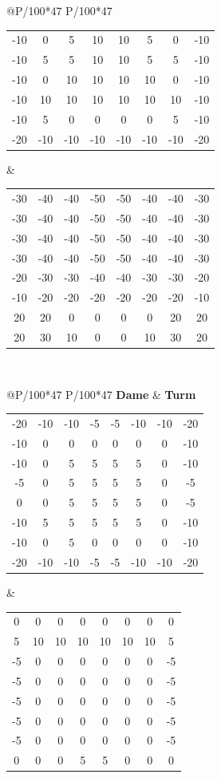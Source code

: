 \begin{table}[htbp]
\begin{tabular}{@{}P{\textwidth/100*47} P{\textwidth/100*47}}
\begin{tabular}{@{}c c c c c c c c}
-10&0&5&10&10&5&0&-10\\
-10&5&5&10&10&5&5&-10\\
-10&0&10&10&10&10&0&-10\\
-10&10&10&10&10&10&10&-10\\
-10&5&0&0&0&0&5&-10\\
-20&-10&-10&-10&-10&-10&-10&-20
\end{tabular}
&
\begin{tabular}{c c c c c c c c}
-30&-40&-40&-50&-50&-40&-40&-30\\
-30&-40&-40&-50&-50&-40&-40&-30\\
-30&-40&-40&-50&-50&-40&-40&-30\\
-30&-40&-40&-50&-50&-40&-40&-30\\
-20&-30&-30&-40&-40&-30&-30&-20\\
-10&-20&-20&-20&-20&-20&-20&-10\\
20&20&0&0&0&0&20&20\\
20&30&10&0&0&10&30&20
\end{tabular}
\end{tabular}\\
\begin{tabular}{@{}P{\textwidth/100*47} P{\textwidth/100*47}}
\textbf{Dame} & \textbf{Turm}\\
\begin{tabular}{@{}c c c c c c c c}
-20&-10&-10&-5&-5&-10&-10&-20\\
-10&0&0&0&0&0&0&-10\\
-10&0&5&5&5&5&0&-10\\
-5&0&5&5&5&5&0&-5\\
0&0&5&5&5&5&0&-5\\
-10&5&5&5&5&5&0&-10\\
-10&0&5&0&0&0&0&-10\\
-20&-10&-10&-5&-5&-10&-10&-20
\end{tabular}
&
\begin{tabular}{c c c c c c c c}
0&0&0&0&0&0&0&0\\
5&10&10&10&10&10&10&5\\
-5&0&0&0&0&0&0&-5\\
-5&0&0&0&0&0&0&-5\\
-5&0&0&0&0&0&0&-5\\
-5&0&0&0&0&0&0&-5\\
-5&0&0&0&0&0&0&-5\\
0&0&0&5&5&0&0&0
\end{tabular}
\end{tabular}
\end{table}


